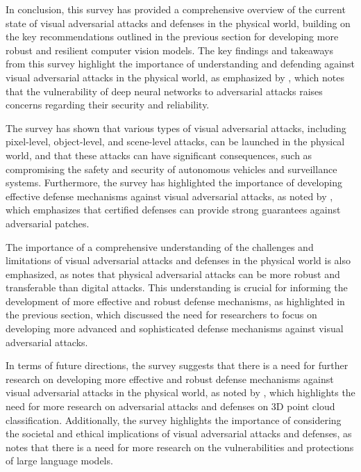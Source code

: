 \documentclass[11pt]{article}
\begin{document}
In conclusion, this survey has provided a comprehensive overview of the current state of visual adversarial attacks and defenses in the physical world, building on the key recommendations outlined in the previous section for developing more robust and resilient computer vision models. The key findings and takeaways from this survey highlight the importance of understanding and defending against visual adversarial attacks in the physical world, as emphasized by \cite{ref15}, which notes that the vulnerability of deep neural networks to adversarial attacks raises concerns regarding their security and reliability.

The survey has shown that various types of visual adversarial attacks, including pixel-level, object-level, and scene-level attacks, can be launched in the physical world, and that these attacks can have significant consequences, such as compromising the safety and security of autonomous vehicles and surveillance systems. Furthermore, the survey has highlighted the importance of developing effective defense mechanisms against visual adversarial attacks, as noted by \cite{ref5}, which emphasizes that certified defenses can provide strong guarantees against adversarial patches.

The importance of a comprehensive understanding of the challenges and limitations of visual adversarial attacks and defenses in the physical world is also emphasized, as \cite{ref160} notes that physical adversarial attacks can be more robust and transferable than digital attacks. This understanding is crucial for informing the development of more effective and robust defense mechanisms, as highlighted in the previous section, which discussed the need for researchers to focus on developing more advanced and sophisticated defense mechanisms against visual adversarial attacks.

In terms of future directions, the survey suggests that there is a need for further research on developing more effective and robust defense mechanisms against visual adversarial attacks in the physical world, as noted by \cite{ref86}, which highlights the need for more research on adversarial attacks and defenses on 3D point cloud classification. Additionally, the survey highlights the importance of considering the societal and ethical implications of visual adversarial attacks and defenses, as \cite{ref240} notes that there is a need for more research on the vulnerabilities and protections of large language models.
\end{document}
